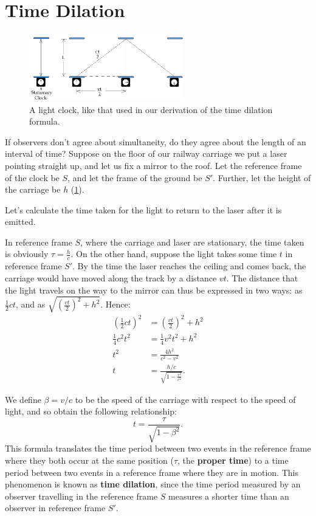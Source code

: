 \documentclass[a4paper]{amsbook}
\theoremstyle{definition}
\numberwithin{exercise}{chapter}
\numberwithin{exercise}{chapter}
\newcommand\capcite[1]{}
\begin{document}
\section{Time Dilation}
\begin{figure}
  \centering
  \includegraphics[width=0.6\textwidth]{lightclock}
  \caption{A light clock, like that used in our derivation of the time dilation formula. \capcite{http://www.geocities.ws/physics_world/sr/image_gif/sr05-im-01.gif} \label{fig:lightclock}}
\end{figure}
If observers don't agree about simultaneity, do they agree about the length of an interval of time? Suppose on the floor of our
railway carriage we put a laser pointing straight up, and let us fix a mirror to the roof. Let the reference frame of the clock
be $ S $, and let the frame of the ground be $ S' $. Further, let the height of the carriage be $ h $ (\cref{fig:lightclock}).

Let's calculate the time taken for the light to return to the laser after it is emitted.

In reference frame $ S $, where the carriage and laser are stationary, the time taken is obviously $ \tau = \frac{h}{c} $. On
the other hand, suppose the light takes some time $ t $ in reference frame $ S' $. By the time the laser reaches the ceiling and comes back,
the carriage would have moved along the track by a distance $ vt $. The distance that the light travels on the way to the mirror can
thus be expressed in two ways: as $ \frac{1}{2} c t $, and as $ \sqrt{\left(\frac{vt}{2}\right)^2 + h^2} $. Hence:
\begin{align*}
  \left(\frac{1}{2} c t\right)^2 &= \left(\frac{vt}{2}\right)^2 + h^2\\
  \frac{1}{4} c^2 t^2            &= \frac{1}{4} v^2 t^2 + h^2\\
  t^2                            &= \frac{4h^2}{c^2 - v^2}\\
  t                              &= \frac{h/c}{\sqrt{1 - \frac{v^2}{c^2}}}.
\end{align*}

We define $ \beta = v/c $ to be the speed of the carriage with respect to the speed of light, and so obtain the following relationship:
\begin{equation}
  t = \frac{\tau}{\sqrt{1 - \beta^2}}.
\end{equation}
This formula translates the time period between two events in the reference frame where they both occur at the same position ($ \tau $, the \textbf{proper time})
to a time period between two events in a reference frame where they are in motion. This phenomenon is known as \textbf{time dilation}, since
the time period measured by an observer travelling in the reference frame $ S $ measures a shorter time than an observer in reference frame $ S' $.
\end{document}
